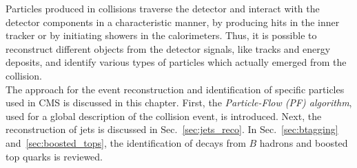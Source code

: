 Particles produced in \pp collisions traverse the detector and interact with the detector components in a characteristic manner, \eg by producing hits in the inner tracker or by initiating showers in the calorimeters. Thus, it is possible to reconstruct different objects from the detector signals, like tracks and energy deposits, and identify various types of particles which actually emerged from the collision. \\
The approach for the event reconstruction and identification of specific particles used in CMS is discussed in this chapter. First, the \textit{Particle-Flow (PF) algorithm}, used for a global description of the collision event, is introduced. Next, the reconstruction of jets is discussed in Sec.~\ref{sec:jets_reco}. In Sec.~\ref{sec:btagging} and~\ref{sec:boosted_tops}, the identification of decays from $B$ hadrons and boosted top quarks is reviewed.
